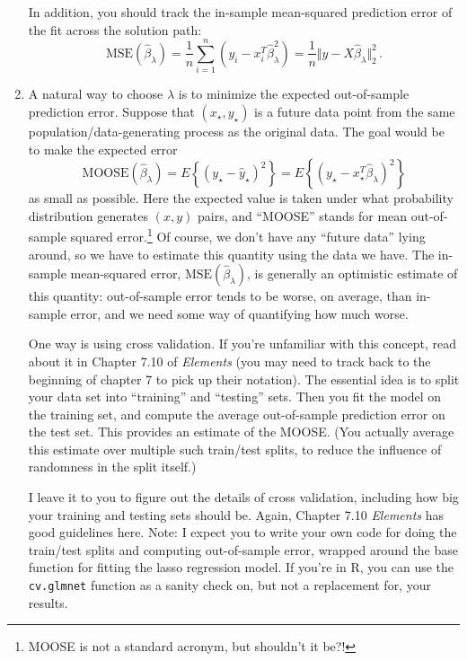 \documentclass{article}
\begin{document}
\begin{enumerate}[label=(\Alph*)]
In addition, you should track the in-sample mean-squared prediction error of the fit across the solution path:
$$
\mathrm{MSE}(\hat \beta_{\lambda}) = \frac{1}{n} \sum_{i=1}^n (y_i - x_i^T \hat \beta_{\lambda}^2) = \frac{1}{n} \Vert y - X \hat \beta_{\lambda} \Vert_2^2 \, .
$$

\item A natural way to choose $\lambda$ is to minimize the expected out-of-sample prediction error.  Suppose that $(x_{\star}, y_{\star})$ is a future data point from the same population/data-generating process as the original data.  The goal would be to make the expected error
$$
\mathrm{MOOSE}(\hat{\beta}_{\lambda}) =  E \left\{ (y_{\star} - \hat{y}_{\star} )^2 \right\} = E \left\{ (y_{\star} - x_\star^T \hat{\beta}_{\lambda} )^2 \right\} 
$$
as small as possible.  Here the expected value is taken under what probability distribution generates $(x,y)$ pairs, and ``MOOSE'' stands for mean out-of-sample squared error.\footnote{MOOSE is not a standard acronym, but shouldn't it be?!}  Of course, we don't have any ``future data'' lying around, so we have to estimate this quantity using the data we have.  The in-sample mean-squared error, $\mathrm{MSE}(\hat \beta_{\lambda})$, is generally an optimistic estimate of this quantity: out-of-sample error tends to be worse, on average, than in-sample error, and we need some way of quantifying how much worse.

One way is using cross validation.  If you're unfamiliar with this concept, read about it in Chapter 7.10 of \textit{Elements} (you may need to track back to the beginning of chapter 7 to pick up their notation).  The essential idea is to split your data set into ``training'' and ``testing'' sets.  Then you fit the model on the training set, and compute the average out-of-sample prediction error on the test set.  This provides an estimate of the MOOSE.  (You actually average this estimate over multiple such train/test splits, to reduce the influence of randomness in the split itself.)

I leave it to you to figure out the details of cross validation, including how big your training and testing sets should be.  Again, Chapter 7.10 \textit{Elements} has good guidelines here.  Note: I expect you to write your own code for doing the train/test splits and computing out-of-sample error, wrapped around the base function for fitting the lasso regression model.   If you're in R, you can use the \verb|cv.glmnet| function as a sanity check on, but not a replacement for, your results.


\end{enumerate}
\end{document}
